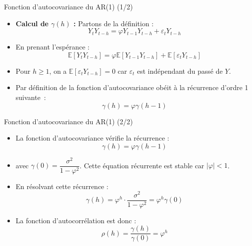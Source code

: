 \documentclass[11pt,aspectratio=169]{beamer}
\newcommand{\E}{\mathbb{E}}
\begin{document}
\begin{frame}{Fonction d'autocovariance du AR(1) (1/2)}

\begin{itemize}

\item \textbf{Calcul de $\gamma(h)$ :}
Partons de la définition :
\[
Y_t Y_{t-h} = \varphi Y_{t-1} Y_{t-h} + \varepsilon_t Y_{t-h}
\]

\item En prenant l'espérance :
\[
\E[Y_t Y_{t-h}] = \varphi \E[Y_{t-1} Y_{t-h}] + \E[\varepsilon_t Y_{t-h}]
\]

\item Pour $h \geq 1$, on a $\E[\varepsilon_t Y_{t-h}] = 0$ car $\varepsilon_t$ est indépendant du passé de $Y$.\newline

\item Par définition de la fonction d'autocovariance obéit à la récurrence d'ordre 1 suivante~:
\[
\gamma(h) = \varphi \gamma(h-1)
\]

\end{itemize}
\end{frame}

\begin{frame}{Fonction d'autocovariance du AR(1) (2/2)}

\begin{itemize}

\item La fonction d'autocovariance vérifie la récurrence :
\[
\gamma(h) = \varphi \gamma(h-1)
\]

\item avec $\gamma(0) = \dfrac{\sigma^2}{1 - \varphi^2}$. Cette équation récurrente est stable car $|\varphi|<1$.\newline

\item En résolvant cette récurrence :
\[
\boxed{\gamma(h) = \varphi^h \cdot \frac{\sigma^2}{1 - \varphi^2} = \varphi^h \gamma(0)}
\]

\item La fonction d'autocorrélation est donc :
\[
\boxed{\rho(h) = \frac{\gamma(h)}{\gamma(0)} = \varphi^h}
\]

\end{itemize}
\end{frame}
\end{document}
